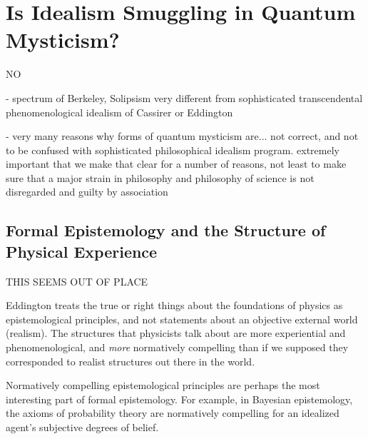 \documentclass{article}
\begin{document}
\section{Is Idealism Smuggling in Quantum Mysticism?}

NO

- spectrum of Berkeley, Solipsism very different from sophisticated transcendental phenomenological idealism of Cassirer or Eddington  

- very many reasons why forms of quantum mysticism are... not correct, and not to be confused with sophisticated philosophical idealism program.  extremely important that we make that clear for a number of reasons, not least to make sure that a major strain in philosophy and philosophy of science is not disregarded and guilty by association






\subsection{Formal Epistemology and the Structure of Physical Experience}

THIS SEEMS OUT OF PLACE

Eddington treats the true or right things about the foundations of physics as epistemological principles, and not statements about an objective external world (realism).  The structures that physicists talk about are more experiential and phenomenological, and \emph{more} normatively compelling than if we supposed they corresponded to realist structures out there in the world.  

Normatively compelling epistemological principles are perhaps the most interesting part of formal epistemology.  For example, in Bayesian epistemology, the axioms of probability theory are normatively compelling for an idealized agent's subjective degrees of belief.  












\end{document}
